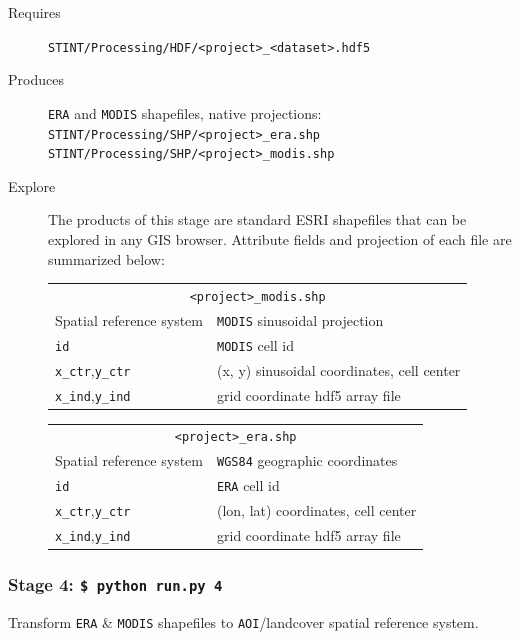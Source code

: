 \documentclass[twoside,a4paper]{refart}
\begin{document}
  \begin{description}
    \item [Requires]
          \texttt{STINT/Processing/HDF/<project>\_<dataset>.hdf5}
  
  
    \item [Produces]
      \texttt{ERA} and \texttt{MODIS} shapefiles, native projections:\\
      \texttt{STINT/Processing/SHP/<project>\_era.shp} \\
      \texttt{STINT/Processing/SHP/<project>\_modis.shp} 
      

    \item [Explore]
      The products of this stage are standard ESRI shapefiles that can be explored in any GIS browser.  Attribute fields and projection of each file are summarized below:
      
\begin{tabular}{ll}
       \multicolumn{2}{c}{\texttt{<project>\_modis.shp}} \\
Spatial reference system        & \texttt{MODIS} sinusoidal projection \\
\texttt{id}                     & \texttt{MODIS} cell id \\  
\texttt{x\_ctr},\texttt{y\_ctr} &  (x, y) sinusoidal coordinates, cell center\\
\texttt{x\_ind},\texttt{y\_ind} & grid coordinate hdf5 array file\\
\end{tabular}
      
\begin{tabular}{ll}
       \multicolumn{2}{c}{ \texttt{<project>\_era.shp}} \\
Spatial reference system        & \texttt{WGS84} geographic coordinates \\
\texttt{id}                     & \texttt{ERA} cell id\\
\texttt{x\_ctr},\texttt{y\_ctr} & (lon, lat) coordinates, cell center \\ 
\texttt{x\_ind},\texttt{y\_ind} & grid coordinate hdf5 array file\\
\end{tabular}

  \end{description}


\subsubsection{\textbf{Stage 4:} \texttt{\$ python run.py 4}}
Transform \texttt{ERA} \& \texttt{MODIS} shapefiles to \texttt{AOI}/landcover spatial reference system.
        
\end{document}
